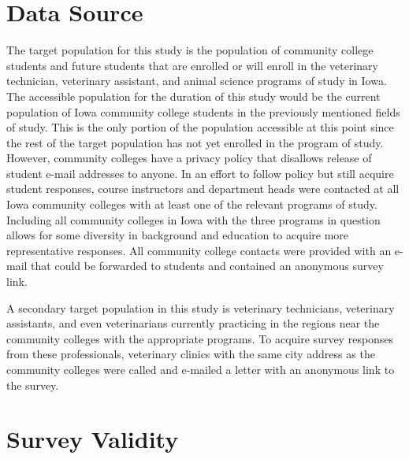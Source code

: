 \section{Data Source}

The target population for this study is the population of community college students and future students that are enrolled or will enroll in the veterinary technician, veterinary assistant, and animal science programs of study in Iowa.  The accessible population for the duration of this study would be the current population of Iowa community college students in the previously mentioned fields of study.  This is the only portion of the population accessible at this point since the rest of the target population has not yet enrolled in the program of study.  However, community colleges have a privacy policy that disallows release of student e-mail addresses to anyone. In an effort to follow policy but still acquire student responses, course instructors and department heads were contacted at all Iowa community colleges with at least one of the relevant programs of study. Including all community colleges in Iowa with the three programs in question allows for some diversity in background and education to acquire more representative responses. All community college contacts were provided with an e-mail that could be forwarded to students and contained an anonymous survey link.
\par A secondary target population in this study is veterinary technicians, veterinary assistants, and even veterinarians currently practicing in the regions near the community colleges with the appropriate programs. To acquire survey responses from these professionals, veterinary clinics with the same city address as the community colleges were called and e-mailed a letter with an anonymous link to the survey.



\section{Survey Validity}

